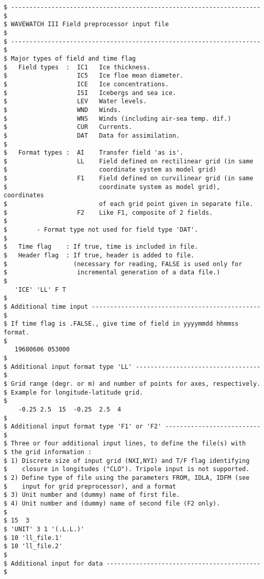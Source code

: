 \begin{footnotesize}
\begin{verbatim}
$ -------------------------------------------------------------------- $
$ WAVEWATCH III Field preprocessor input file                          $
$ -------------------------------------------------------------------- $
$ Major types of field and time flag
$   Field types  :  IC1   Ice thickness.
$                   IC5   Ice floe mean diameter.
$                   ICE   Ice concentrations.
$                   ISI   Icebergs and sea ice.
$                   LEV   Water levels.
$                   WND   Winds.
$                   WNS   Winds (including air-sea temp. dif.)
$                   CUR   Currents.
$                   DAT   Data for assimilation.
$
$   Format types :  AI    Transfer field 'as is'.
$                   LL    Field defined on rectilinear grid (in same
$                         coordinate system as model grid)
$                   F1    Field defined on curvilinear grid (in same
$                         coordinate system as model grid), coordinates
$                         of each grid point given in separate file.
$                   F2    Like F1, composite of 2 fields.
$
$        - Format type not used for field type 'DAT'.
$
$   Time flag    : If true, time is included in file.
$   Header flag  : If true, header is added to file.
$                  (necessary for reading, FALSE is used only for
$                   incremental generation of a data file.)
$
   'ICE' 'LL' F T
$
$ Additional time input ---------------------------------------------- $
$ If time flag is .FALSE., give time of field in yyyymmdd hhmmss format.
$
   19680606 053000
$
$ Additional input format type 'LL' ---------------------------------- $
$ Grid range (degr. or m) and number of points for axes, respectively.
$ Example for longitude-latitude grid.
$
    -0.25 2.5  15  -0.25  2.5  4
$
$ Additional input format type 'F1' or 'F2' -------------------------- $
$ Three or four additional input lines, to define the file(s) with
$ the grid information :
$ 1) Discrete size of input grid (NXI,NYI) and T/F flag identifying
$    closure in longitudes ("CLO"). Tripole input is not supported.
$ 2) Define type of file using the parameters FROM, IDLA, IDFM (see
$    input for grid preprocessor), and a format
$ 3) Unit number and (dummy) name of first file.
$ 4) Unit number and (dummy) name of second file (F2 only).
$
$ 15  3                                              
$ 'UNIT' 3 1 '(.L.L.)'
$ 10 'll_file.1'
$ 10 'll_file.2'      
$
$ Additional input for data ------------------------------------------ $

\end{verbatim}
\end{footnotesize}
